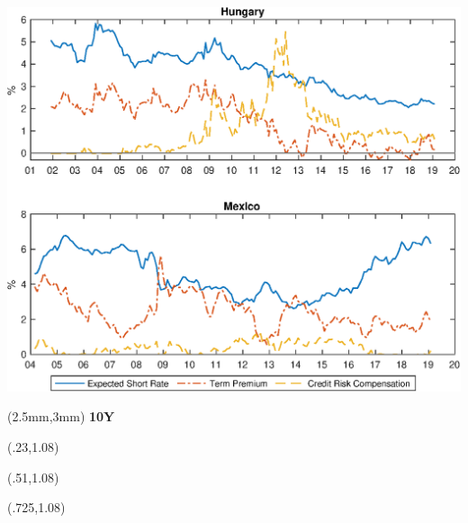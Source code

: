 \documentclass[12pt, aspectratio=169, xcolor=dvipsnames]{beamer}
\begin{document}
\begin{frame}[label=YldDcmp2]
\begin{center}							%
\includegraphics[trim={0cm 0cm 0cm 0cm},clip,height=0.95\textheight,width=\linewidth]{../Figures/Estimation/HUF_MXN_dcmp.eps} \\
\end{center}
\begin{textblock*}{15cm}(2.5mm,3mm)
	\textbf{10Y}
\end{textblock*}
\begin{textblock*}{3cm}(.23\textwidth,1.08\textheight)
	\hyperlink{yPscbp}{}
\end{textblock*}
\begin{textblock*}{3cm}(.51\textwidth,1.08\textheight)
\hyperlink{tpCI}{}
\end{textblock*}
\begin{textblock*}{5cm}(.725\textwidth,1.08\textheight)
\hyperlink{crcCI}{}
\end{textblock*}
\end{frame}
\end{document}
